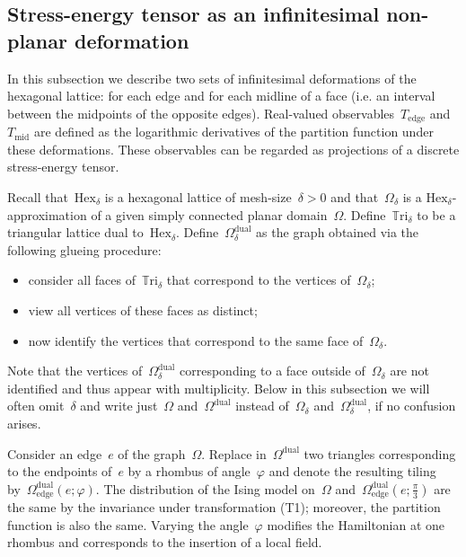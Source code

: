 \documentclass[reqno,11pt,a4paper]{amsart}
\theoremstyle{remark}
\newcommand{\T}{\mathbb{T}\mathrm{ri}}
\newcommand{\Hex}{\mathrm{Hex}}
\newcommand{\Te}{T_{\mathrm{edge}}}       \newcommand{\Ce}{c_{\mathrm{edge}}}
\newcommand{\Tm}{T_{\mathrm{mid}}}        \newcommand{\Cm}{c_{\mathrm{mid}}}
\newcommand{\OmegaDual}{\Omega^{\mathrm{dual}}}
\newcommand{\OmegaE}{\OmegaDual_{\mathrm{edge}}}
\begin{document}
\subsection{Stress-energy tensor as an infinitesimal non-planar deformation}
\label{sub:stress-tensor-as-deformation}

In this subsection we describe two sets of infinitesimal deformations of the hexagonal lattice: for each edge and for each midline of a face (i.e. an interval between the midpoints of the opposite edges). Real-valued observables~$\Te$ and~$\Tm$ are defined as the logarithmic derivatives of the partition function under these deformations. 
These observables can be regarded as projections of a discrete stress-energy tensor.

Recall that~$\Hex_\delta$ is a hexagonal lattice of mesh-size~$\delta>0$ and that~$\Omega_\delta$ is a $\Hex_\delta$-approximation of a given simply connected planar domain~$\Omega$.
Define~$\T_\delta$ to be a triangular lattice dual to~$\Hex_\delta$.
Define~$\OmegaDual_\delta$ as the graph obtained via the following glueing procedure:
\begin{itemize}
	\item consider all faces of~$\T_\delta$ that correspond to the vertices of~$\Omega_\delta$;
	\item view all vertices of these faces as distinct;
	\item now identify the vertices that correspond to the same face of~$\Omega_\delta$.
\end{itemize}
Note that the vertices of~$\OmegaDual_\delta$ corresponding to a face outside of~$\Omega_\delta$ are not identified and thus appear with multiplicity.
Below in this subsection we will often omit~$\delta$ and write just~$\Omega$ and~$\OmegaDual$ instead of~$\Omega_\delta$ and~$\OmegaDual_\delta$, if no confusion arises.

Consider an edge~$e$ of the graph~$\Omega$. Replace in~$\OmegaDual$ two triangles corresponding to the endpoints of~$e$
by a rhombus of angle~$\varphi$ and denote the resulting tiling by~$\OmegaE(e;\varphi)$. 
The distribution of the Ising model on~$\Omega$ and~$\OmegaE(e;\tfrac\pi{3})$ are the same by the invariance under transformation (T1);
moreover, the partition function is also the same.
Varying the angle~$\varphi$ modifies the Hamiltonian at one rhombus and corresponds to the insertion of a local field. 
\end{document}
